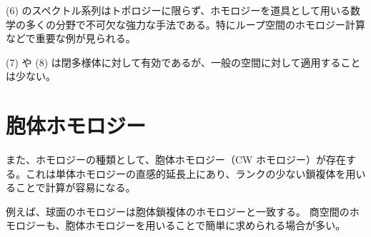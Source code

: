 \documentclass{article}
\begin{document}
(6) のスペクトル系列はトポロジーに限らず、ホモロジーを道具として用いる数学の多くの分野で不可欠な強力な手法である。特にループ空間のホモロジー計算などで重要な例が見られる。

(7) や (8) は閉多様体に対して有効であるが、一般の空間に対して適用することは少ない。

\section{胞体ホモロジー}
また、ホモロジーの種類として、胞体ホモロジー（CW ホモロジー）が存在する。これは単体ホモロジーの直感的延長上にあり、ランクの少ない鎖複体を用いることで計算が容易になる。

例えば、球面のホモロジーは胞体鎖複体のホモロジーと一致する。
商空間のホモロジーも、胞体ホモロジーを用いることで簡単に求められる場合が多い。

\end{document}
